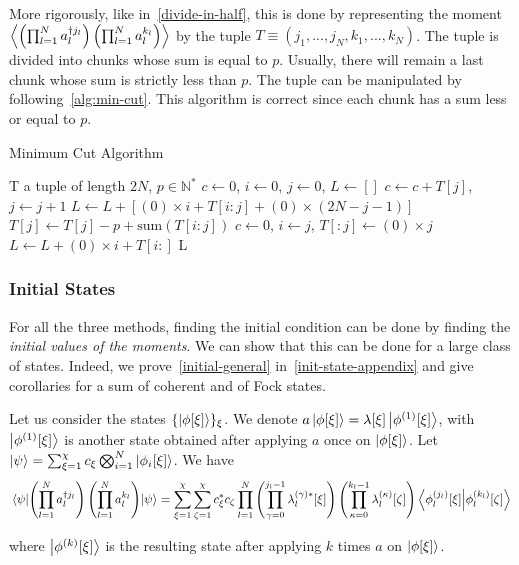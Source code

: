 More rigorously, like in~\autoref{divide-in-half}, this is done by representing the moment $\left\langle \left(\prod_{l=1}^N a^{\dagger j_l}_l\right) \left(\prod_{l=1}^N a^{k_l}_l\right) \right\rangle$ by the tuple $T \equiv (j_1, ..., j_N, k_1, ..., k_N)$. The tuple is divided into chunks whose sum is equal to $p$. Usually, there will remain a last chunk whose sum is strictly less than $p$. The tuple can be manipulated by following~\autoref{alg:min-cut}. This algorithm is correct since each chunk has a sum less or equal to $p$.
\begin{algorithm}
\caption{Minimum Cut Algorithm}\label{alg:min-cut}
\begin{algorithmic}
\Require T a tuple of length $2 N$, $p \in \mathbb{N}^*$
\State $c \gets 0$, $i \gets 0$, $j \gets 0$, $L \gets []$
 
    \State $c \gets c + T[j]$, $j \gets j + 1$ 
\Else {}
    \State $L \gets L + [(0)\times i + T[i:j] + (0)\times (2N-j-1)]$ 
    \State $T[j] \gets T[j] - p + \text{sum}(T[i:j])$ 
    \State $c \gets 0$, $i \gets j$, $T[:j] \gets(0) \times j$
\EndIf
\EndWhile
\State $L \gets L + (0)\times i + T[i:]$ 
\State \Return L
\end{algorithmic}
\end{algorithm}

\subsubsection{Initial States}

For all the three methods, finding the initial condition can be done by finding the \textit{initial values of the moments}. We can show that this can be done for a large class of states. Indeed, we prove~\autoref{initial-general} in~\autoref{init-state-appendix} and give corollaries for a sum of coherent and of Fock states.

\begin{theorem} \label{initial-general}
Let us consider the states $\{\ket{\phi[\xi]}\}_\xi$. We denote $a \ket{\phi[\xi]} = \lambda[\xi] \ket{\phi^{(1)}[\xi]}$, with $\ket{\phi^{(1)}[\xi]}$ is another state obtained after applying $a$ once on $\ket{\phi[\xi]}$. Let $\ket{\psi} = \sum_{\xi=1}^\chi c_\xi
\bigotimes_{i=1}^N \ket{\phi_i[\xi]}$. We have
\begin{equation}
    \mel{\psi}{\left(\prod_{l=1}^N a^{\dagger j_l}_l\right) \left(\prod_{l=1}^N a^{k_l}_l\right)}{\psi} = \sum_{\xi=1}^\chi \sum_{\zeta=1}^\chi c^*_\xi c_\zeta \prod_{l=1}^N \left(\prod_{\gamma = 0}^{j_l - 1} \lambda^{(\gamma)*}_l[\xi]\right) \left(\prod_{\kappa = 0}^{k_l - 1} \lambda^{(\kappa)}_l[\zeta]\right) \braket{\phi^{(j_l)}_l[\xi]}{\phi^{(k_l)}_{l}[\zeta]}
\end{equation}

where $\ket{\phi^{(k)}[\xi]}$ is the resulting state after applying $k$ times $a$ on $\ket{\phi[\xi]}$.
\end{theorem}

